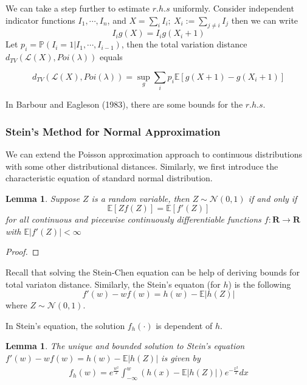 \documentclass[11pt,english]{smfart}
\newtheorem{lemma}[theorem]{Lemma}
\newcommand{\mb}{\mathbb}
\newcommand{\mf}{\mathbf}
\begin{document}
We can take a step further to estimate $r.h.s$ uniformly. Consider independent indicator functions $I_1,\cdots,I_n$, and $\displaystyle{X = \sum_{i}I_i};\  X_i := \sum_{j\neq i}I_j$ then we can write
$$I_ig(X) = I_i g(X_i + 1)$$
Let $p_i = \mb{P}\left(I_i = 1 | I_1, \cdots, I_{i-1}\right)$, then the total variation distance $d_{TV}\left(\mathcal{L}(X),Poi(\lambda)\right)$ equals

$$d_{TV}\left(\mathcal{L}(X),Poi(\lambda)\right) = \sup_{g} \sum_{i} p_i \mb{E}\left[g(X+1) - g(X_i +1)\right]$$

In Barbour and Eagleson (1983), there are some bounds for the $r.h.s$. 


\subsubsection{Stein's Method for Normal Approximation}
We can extend the Poisson approximation approach to continuous distributions with some other distributional distances. Similarly, we first introduce the characteristic equation of standard normal distribution. \\
\begin{lemma}
    Suppose $Z$ is a random variable, then $Z\sim \mathcal{N}(0,1)$ if and only if 
    $$\mb{E}\left[Zf(Z)\right] = \mb{E}\left[f'(Z)\right]$$
    for all continuous and piecewise continuously differentiable functions $f:\mf{R}\rightarrow \mf{R}$ with $\mb{E}|f'(Z)| <\infty$
\end{lemma}
\begin{proof}
    
\end{proof}
Recall that solving the Stein-Chen equation can be help of deriving bounds for total variaton distance. Similarly, the Stein's equaton (for $h$) is the following
$$f'(w) - wf(w) = h(w) - \mb{E}|h(Z)| $$
where $Z\sim \mathcal{N}(0,1).$

In Stein's equation, the solution $f_h(\cdot)$ is dependent of $h$. \\

\begin{lemma}
    The unique and bounded solution to Stein's equation $f'(w) - wf(w) = h(w) - \mb{E}|h(Z)|$ is given by 
    \begin{align*}
        f_h(w) = e^{\frac{w^2}{2}} \int_{-\infty}^w (h(x) - \mb{E}|h(Z)|) e^{-\frac{x^2}{2}} dx
    \end{align*}
\end{lemma}
\end{document}
